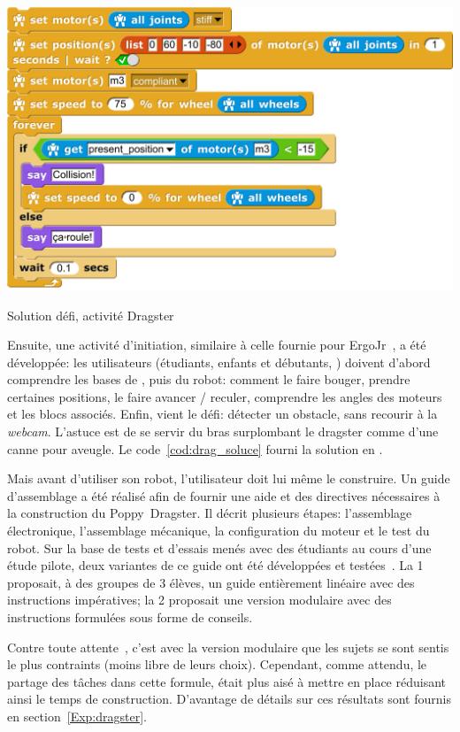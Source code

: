             \begin{code}
                \centering
                \includegraphics[width=0.75\linewidth]{Figures/Dragster_soluce}
                \caption{Solution défi, activité Dragster}\label{cod:drag_soluce}
            \end{code}\par%
            Ensuite, une activité d'initiation, similaire à celle fournie pour ErgoJr~, a été développée: les utilisateurs (étudiants, enfants et débutants, \etc) doivent d'abord comprendre les bases de , puis du robot: comment le faire bouger, prendre certaines positions, le faire avancer / reculer, comprendre les angles des moteurs et les blocs associés. Enfin, vient le défi: détecter un obstacle, sans recourir à la \textit{webcam}. L'astuce est de se servir du bras surplombant le dragster comme d'une canne pour aveugle. Le code~\ref{cod:drag_soluce} fourni la solution en .\par%
            Mais avant d'utiliser son robot, l'utilisateur doit lui même le construire. Un guide d'assemblage a été réalisé afin de fournir une aide et des directives nécessaires à la construction du Poppy~Dragster. Il décrit plusieurs étapes: l'assemblage électronique, l'assemblage mécanique, la configuration du moteur et le test du robot.
            Sur la base de tests et d'essais menés avec des étudiants au cours d'une étude pilote, %
            deux variantes de ce guide ont été développées et testées~. La 1\iere{} proposait, à des groupes de 3 élèves, un guide entièrement linéaire avec des instructions impératives; la 2\nd{} proposait une version modulaire avec des instructions formulées sous forme de conseils.\par%
            Contre toute attente~, c'est avec la version modulaire que les sujets se sont sentis le plus contraints (moins libre de leurs choix). Cependant, comme attendu, le partage des tâches dans cette formule, était plus aisé à mettre en place réduisant ainsi le temps de construction. D'avantage de détails sur ces résultats sont fournis en section~\ref{Exp:dragster}.